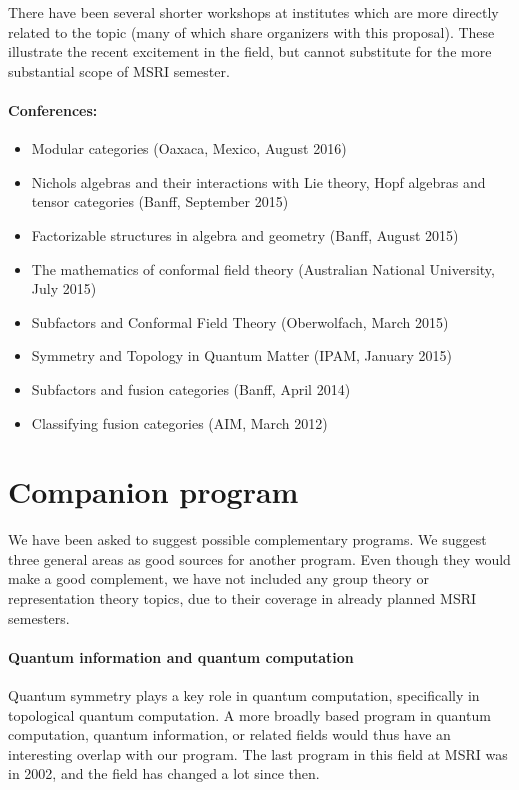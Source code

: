 \documentclass[12pt]{article}
\begin{document}
There have been several shorter workshops at institutes which are more directly related to the topic (many of which share organizers with this proposal).  These illustrate the recent excitement in the field, but cannot substitute for the more substantial scope of MSRI semester.

\paragraph{Conferences:}
\begin{itemize}
  \setlength{\itemsep}{1pt}
  \setlength{\parskip}{0pt}
  \setlength{\parsep}{0pt}
\item Modular categories (Oaxaca, Mexico, August 2016)
\item Nichols algebras and their interactions with Lie theory, Hopf algebras and tensor categories (Banff, September 2015)
\item Factorizable structures in algebra and geometry (Banff, August 2015)
\item The mathematics of conformal field theory (Australian National University, July 2015)
\item Subfactors and Conformal Field Theory (Oberwolfach, March 2015)
\item Symmetry and Topology in Quantum Matter (IPAM, January 2015)
\item Subfactors and fusion categories (Banff, April 2014)
\item Classifying fusion categories (AIM, March 2012)
\end{itemize}

\section{Companion program}
We have been asked to suggest possible complementary programs. We suggest three general areas as good sources for another program. Even though they would make a good complement, we have not included any group theory or representation theory topics, due to their coverage in already planned MSRI semesters.

\paragraph{Quantum information and quantum computation}
Quantum symmetry plays a key role in quantum computation, specifically in topological quantum computation.  A more broadly based program in quantum computation, quantum information, or related fields would thus have an interesting overlap with our program.  The last program in this field at MSRI was in 2002, and the field has changed a lot since then.
\end{document}
